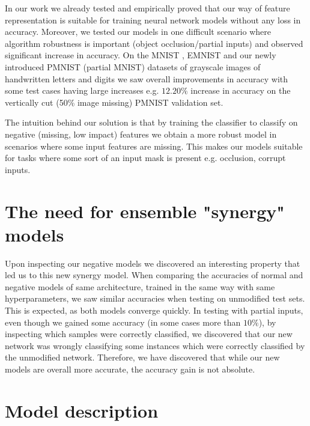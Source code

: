 \documentclass[b5paper]{book}
\let\cite\parencite
\begin{document}
In our work we already tested and empirically proved that our way of feature representation is suitable for training neural network models without any loss in accuracy. Moreover, we tested our models in one difficult scenario where algorithm robustness is important (object occlusion/partial inputs) and observed significant increase in accuracy. On the MNIST \cite{lecun1998mnist}, EMNIST \cite{cohen2017emnist} and our newly introduced PMNIST (partial MNIST) datasets of grayscale images of handwritten letters and digits we saw overall improvements in accuracy with some test cases having large increases e.g. \( 12.20\% \) increase in accuracy on the vertically cut (50\% image missing) PMNIST validation set. 

The intuition behind our solution is that by training the classifier to classify on negative (missing, low impact) features we obtain a more robust model in scenarios where some input features are missing. This makes our models suitable for tasks where some sort of an input mask is present e.g. occlusion, corrupt inputs.

\section{The need for ensemble "synergy" models}

Upon inspecting our negative models we discovered an interesting property that led us to this new synergy model. When comparing the accuracies of normal and negative models of same architecture, trained in the same way with same hyperparameters, we saw similar accuracies when testing on unmodified test sets. This is expected, as both models converge quickly. In testing with partial inputs, even though we gained some accuracy (in some cases more than \(10\%\)), by inspecting which samples were correctly classified, we discovered that our new network was wrongly classifying some instances which were correctly classified by the unmodified network. Therefore, we have discovered that while our new models are overall more accurate, the accuracy gain is not absolute.

\section{Model description}
\label{model}
\end{document}
